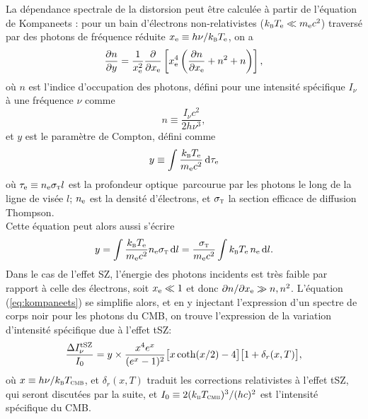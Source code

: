 La dépendance spectrale de la distorsion peut être calculée à partir de l'équation de Kompaneets \cite{kompaneets_establishment_1957, freire_oliveira_derivation_2021}: pour un bain d'électrons non-relativistes ($k_\textsc{b} T_{\rm e} \ll m_{\rm e} c^2$) traversé par des photons de fréquence réduite $x_{\rm e} \equiv h\nu/k_\textsc{b} T_{\rm e}$, on a
\begin{equation}
    \label{eq:kompaneets}
    \frac{\partial n}{\partial y} = \frac{1}{x_{\rm e}^2}\frac{\partial }{\partial x_{\rm e}} \left[ x_{\rm e}^4\left( \frac{\partial n}{\partial x_{\rm e}} + n^2 + n \right) \right],
\end{equation}
où $n$ est l'indice d'occupation des photons, défini pour une intensité spécifique $I_\nu$ à une fréquence $\nu$ comme
\begin{equation}
    n \equiv \frac{I_\nu c^2}{2 h \nu^3},
\end{equation}
et $y$ est le paramètre de Compton, défini comme
\begin{equation}
    y \equiv \int \frac{k_\textsc{b} T_{\rm e}}{m_{\rm e} c^2} \, \mathrm{d}\tau_{\rm e}
\end{equation}
où $\tau_{\rm e} \equiv n_{\rm e} \sigma_\textsc{t} l$ est la profondeur optique\footnotemark\ parcourue par les photons le long de la ligne de visée $l$; $n_{\rm e}$ est la densité d'électrons, et $\sigma_\textsc{t}$ la section efficace de diffusion Thompson. \\
Cette équation peut alors aussi s'écrire
\begin{equation}
    \label{eq:sz_y}
    y = \int \frac{k_\textsc{b} T_{\rm e}}{m_{\rm e} c^2} n_{\rm e} \sigma_\textsc{t} \, \mathrm{d} l
      = \frac{\sigma_\textsc{t}}{m_{\rm e} c^2} \int k_\textsc{b} T_{\rm e} \, n_{\rm e} \, \mathrm{d} l.
\end{equation}
Dans le cas de l'effet SZ, l'énergie des photons incidents est très faible par rapport à celle des électrons, soit $x_{\rm e} \ll 1$ et donc $\partial n / \partial x_{\rm e} \gg n, n^2$.
L'équation (\ref{eq:kompaneets}) se simplifie alors, et en y injectant l'expression d'un spectre de corps noir pour les photons du CMB, on trouve l'expression de la variation d'intensité spécifique due à l'effet tSZ:
\begin{equation}
    \label{eq:sz_dI}
    \frac{\Delta I_\nu^{\rm tSZ}}{I_0} = y \times \frac{x^4 e^x}{(e^x - 1)^2} \big[ x \, {\rm coth}(x/2) - 4 \big] \big[ 1 + \delta_r(x, T) \big],
\end{equation}
où $x \equiv h\nu / k_\textsc{b}T_\textsc{cmb}$, et $\delta_r(x, T)$ traduit les corrections relativistes à l'effet tSZ, qui seront discutées par la suite, et $I_0 \equiv 2(k_\textsc{b} T_\textsc{cmb})^3 / (hc)^2$ est l'intensité spécifique du CMB.

